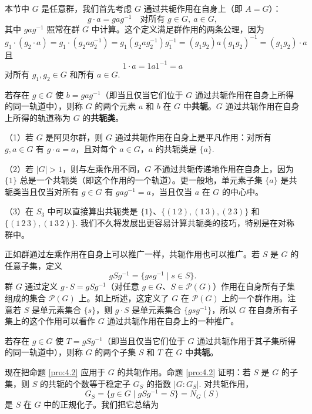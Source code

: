 本节中 \(G\) 是任意群，我们首先考虑 \(G\) 通过共轭作用在自身上（即 \(A = G\)）：
\[
g \cdot a = gag^{-1} \quad \text{对所有 } g \in G,\ a \in G,
\]
其中 \(gag^{-1}\) 照常在群 \(G\) 中计算。这个定义满足群作用的两条公理，因为
\[
g_1 \cdot (g_2 \cdot a) = g_1 \cdot (g_2 a g_2^{-1}) = g_1(g_2 a g_2^{-1})g_1^{-1} = (g_1 g_2)a(g_1 g_2)^{-1} = (g_1 g_2) \cdot a
\]
且
\[
1 \cdot a = 1a1^{-1} = a
\]
对所有 \(g_1, g_2 \in G\) 和所有 \(a \in G\).

\begin{definition}
若存在 \(g \in G\) 使 \(b = gag^{-1}\)（即当且仅当它们位于 \(G\) 通过共轭作用在自身上所得的同一轨道中），则称 \(G\) 的两个元素 \(a\) 和 \(b\) 在 \(G\) 中\textbf{共轭}。\(G\) 通过共轭作用在自身上所得的轨道称为 \(G\) 的\textbf{共轭类}。
\end{definition}

\begin{example}
（1）若 \(G\) 是阿贝尔群，则 \(G\) 通过共轭作用在自身上是平凡作用：对所有 \(g, a \in G\) 有 \(g \cdot a = a\)，且对每个 \(a \in G\)，\(a\) 的共轭类是 \(\{a\}\).

（2）若 \(|G| > 1\)，则与左乘作用不同，\(G\) 不通过共轭传递地作用在自身上，因为 \(\{1\}\) 总是一个共轭类（即这个作用的一个轨道）。更一般地，单元素子集 \(\{a\}\) 是共轭类当且仅当对所有 \(g \in G\) 有 \(gag^{-1} = a\)，当且仅当 \(a\) 在 \(G\) 的中心中。

（3）在 \(S_3\) 中可以直接算出共轭类是 \(\{1\}\)、\(\{(1\,2), (1\,3), (2\,3)\}\) 和 \(\{(1\,2\,3), (1\,3\,2)\}\). 我们不久将发展出更容易计算共轭类的技巧，特别是在对称群中。
\end{example}

正如群通过左乘作用在自身上可以推广一样，共轭作用也可以推广。若 \(S\) 是 \(G\) 的任意子集，定义
\[
gSg^{-1} = \{gsg^{-1} \mid s \in S\}.
\]
群 \(G\) 通过定义 \(g \cdot S = gSg^{-1}\)（对任意 \(g \in G\)、\(S \in \mathcal{P}(G)\)）作用在自身所有子集组成的集合 \(\mathcal{P}(G)\) 上。如上所述，这定义了 \(G\) 在 \(\mathcal{P}(G)\) 上的一个群作用。注意若 \(S\) 是单元素集合 \(\{s\}\)，则 \(g \cdot S\) 是单元素集合 \(\{gsg^{-1}\}\)，所以 \(G\) 在自身所有子集上的这个作用可以看作 \(G\) 通过共轭作用在自身上的一种推广。

\begin{definition}
若存在 \(g \in G\) 使 \(T = gSg^{-1}\)（即当且仅当它们位于 \(G\) 通过共轭作用于其子集所得的同一轨道中），则称 \(G\) 的两个子集 \(S\) 和 \(T\) 在 \(G\) 中\textbf{共轭}。
\end{definition}

现在把命题 \ref{pro:4.2} 应用于 \(G\) 的共轭作用。命题 \ref{pro:4.2} 证明：若 \(S\) 是 \(G\) 的子集，则 \(S\) 的共轭的个数等于稳定子 \(G_S\) 的指数 \(|G : G_S|\). 对共轭作用，
\[
G_S = \{g \in G \mid gSg^{-1} = S\} = N_G(S)
\]
是 \(S\) 在 \(G\) 中的正规化子。我们把它总结为

